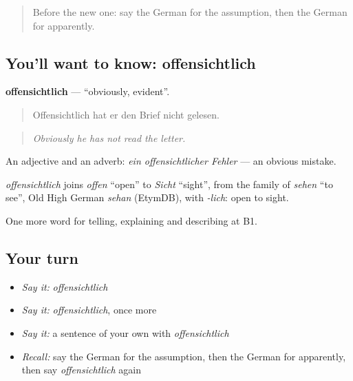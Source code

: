 \label{lesson:GE-C338-offensichtlich}



\begin{quote}
Before the new one: say the German for the assumption, then the German for apparently.
\end{quote}

\subsection*{You'll want to know: offensichtlich}
\textbf{offensichtlich} — \textquotedblleft{}obviously, evident\textquotedblright{}.

\begin{quote}
Offensichtlich hat er den Brief nicht gelesen.
\end{quote}

\begin{quote}
\emph{Obviously he has not read the letter.}
\end{quote}

An adjective and an adverb: \emph{ein offensichtlicher Fehler} — an obvious mistake.

\begin{cousinweb}
\emph{offensichtlich} joins \emph{offen} \textquotedblleft{}open\textquotedblright{} to \emph{Sicht} \textquotedblleft{}sight\textquotedblright{}, from the family of \emph{sehen} \textquotedblleft{}to see\textquotedblright{}, Old High German \emph{sehan} (EtymDB), with \emph{-lich}: open to sight.
\end{cousinweb}

\begin{grammarlens}[title={What you've built}]
One more word for telling, explaining and describing at B1.
\end{grammarlens}

\subsection*{Your turn}
\begin{itemize}
\raggedright
  \item \emph{Say it:} \emph{offensichtlich}
  \item \emph{Say it:} \emph{offensichtlich}, once more
  \item \emph{Say it:} a sentence of your own with \emph{offensichtlich}
  \item \emph{Recall:} say the German for the assumption, then the German for apparently, then say \emph{offensichtlich} again
\end{itemize}

